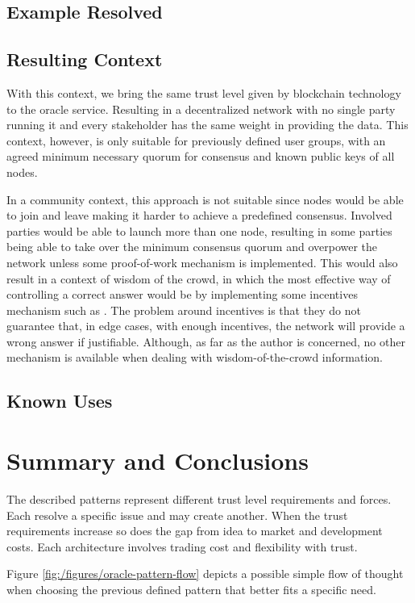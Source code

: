 \subsection{Example Resolved}
\subsection{Resulting Context}
With this context, we bring the same trust level given by blockchain technology to the oracle service. Resulting in a decentralized network with no single party running it and every stakeholder has the same weight in providing the data. This context, however, is only suitable for previously defined user groups, with an agreed minimum necessary quorum for consensus and known public keys of all nodes.

In a community context, this approach is not suitable since nodes would be able to join and leave making it harder to achieve a predefined consensus. Involved parties would be able to launch more than one node, resulting in some parties being able to take over the minimum consensus quorum and overpower the network unless some proof-of-work mechanism is implemented. This would also result in a context of wisdom of the crowd, in which the most effective way of controlling a correct answer would be by implementing some incentives mechanism such as \cite{Adler2018a}. The problem around incentives is that they do not guarantee that, in edge cases, with enough incentives, the network will provide a wrong answer if justifiable. Although, as far as the author is concerned, no other mechanism is available when dealing with wisdom-of-the-crowd information.



\subsection{Known Uses}


\section{Summary and Conclusions}
The described patterns represent different trust level requirements and forces. Each resolve a specific issue and may create another. When the trust requirements increase so does the gap from idea to market and development costs. Each architecture involves trading cost and flexibility with trust.

Figure \ref{fig:/figures/oracle-pattern-flow} depicts a possible simple flow of thought when choosing the previous defined pattern that better fits a specific need.


